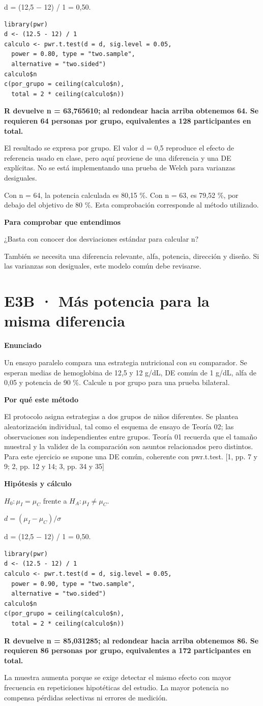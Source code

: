 \documentclass[10pt,a4paper]{article}
\newcommand{\etiqueta}[1]{\par{\bfseries\color{Blue}#1}\par}
\newcommand{\cajares}[1]{\par\colorbox{Pale}{\parbox{\dimexpr\linewidth-2\fboxsep}{\vspace{4pt}\textbf{\color{Navy}#1}\vspace{4pt}}}\par}
\begin{document}
d = (12,5 \ensuremath{-} 12) / 1 = 0,50.
\begin{Verbatim}
library(pwr)
d <- (12.5 - 12) / 1
calculo <- pwr.t.test(d = d, sig.level = 0.05,
  power = 0.80, type = "two.sample",
  alternative = "two.sided")
calculo$n
c(por_grupo = ceiling(calculo$n),
  total = 2 * ceiling(calculo$n))
\end{Verbatim}
\cajares{R devuelve n = 63,765610; al redondear hacia arriba obtenemos 64. Se requieren 64 personas por grupo, equivalentes a 128 participantes en total.}
El resultado se expresa por grupo. El valor d = 0,5 reproduce el efecto de referencia usado en clase, pero aquí proviene de una diferencia y una DE explícitas. No se está implementando una prueba de Welch para varianzas desiguales.

{\small\color{Gray}Con n = 64, la potencia calculada es 80,15 \%. Con n = 63, es 79,52 \%, por debajo del objetivo de 80 \%. Esta comprobación corresponde al método utilizado.}
\etiqueta{Para comprobar que entendimos}
¿Basta con conocer dos desviaciones estándar para calcular n?

{\small También se necesita una diferencia relevante, alfa, potencia, dirección y diseño. Si las varianzas son desiguales, este modelo común debe revisarse.}
\clearpage
\section*{E3B · Más potencia para la misma diferencia}
\etiqueta{Enunciado}
Un ensayo paralelo compara una estrategia nutricional con su comparador. Se esperan medias de hemoglobina de 12,5 y 12 g/dL, DE común de 1 g/dL, alfa de 0,05 y potencia de 90 \%. Calcule n por grupo para una prueba bilateral.
\etiqueta{Por qué este método}
El protocolo asigna estrategias a dos grupos de niños diferentes. Se plantea aleatorización individual, tal como el esquema de ensayo de Teoría 02; las observaciones son independientes entre grupos. Teoría 01 recuerda que el tamaño muestral y la validez de la comparación son asuntos relacionados pero distintos. Para este ejercicio se supone una DE común, coherente con pwr.t.test. [1, pp. 7 y 9; 2, pp. 12 y 14; 3, pp. 34 y 35]
\etiqueta{Hipótesis y cálculo}
$H_0:\mu_I=\mu_C$ frente a $H_A:\mu_I\ne\mu_C$.

$d=(\mu_I-\mu_C)/\sigma$

d = (12,5 \ensuremath{-} 12) / 1 = 0,50.
\begin{Verbatim}
library(pwr)
d <- (12.5 - 12) / 1
calculo <- pwr.t.test(d = d, sig.level = 0.05,
  power = 0.90, type = "two.sample",
  alternative = "two.sided")
calculo$n
c(por_grupo = ceiling(calculo$n),
  total = 2 * ceiling(calculo$n))
\end{Verbatim}
\cajares{R devuelve n = 85,031285; al redondear hacia arriba obtenemos 86. Se requieren 86 personas por grupo, equivalentes a 172 participantes en total.}
La muestra aumenta porque se exige detectar el mismo efecto con mayor frecuencia en repeticiones hipotéticas del estudio. La mayor potencia no compensa pérdidas selectivas ni errores de medición.
\end{document}
